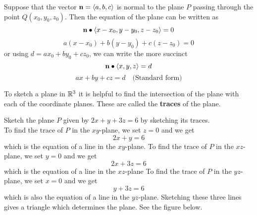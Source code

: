 \documentclass[handout]{ximera}
\begin{document}
\begin{proposition}
Suppose that the vector $\mathbf{n} = \left\langle a,b,c\right\rangle$ is normal to the plane $P$ passing through the point $Q(x_0, y_0, z_0)$.
Then the equation of the plane can be written as
\[
\vec{n} \dotp \vector{x-x_0, y-y_0, z-z_0} = 0 %
\]
\[
a(x-x_0) + b(y-y_0) + c(z-z_0) = 0 %
\]
or using $d = ax_0 + by_0 + cz_0$,  we can write the more succinct
\[
\vec{n} \dotp \vector{x, y, z} = d %
\]
\[
ax+by+cz = d \quad \text{(Standard form)}
\]
\end{proposition}

To sketch a plane in $\mathbb R^3$ it is helpful to find the intersection of the plane with each of the coordinate planes.  
These are called the {\bf traces} of the plane.

\begin{example}
Sketch the plane $P$ given by $2x + y + 3z = 6$ by sketching its traces.\\
To find the trace of $P$ in the $xy$-plane, we set $z = 0$ and we get
\[
2x +y = 6
\]
which is the equation of a line in the $xy$-plane.
To find the trace of $P$ in the $xz$-plane, we set $y = 0$ and we get
\[
2x +3z = 6
\]
which is the equation of a line in the $xz$-plane
To find the trace of $P$ in the $yz$-plane, we set $x = 0$ and we get
\[
 y + 3z = 6
\]
which is also the equation of a line in the $yz$-plane.
Sketching these three lines gives a triangle which determines the plane.
See the figure below.

\begin{image}
\end{image}

\end{example}
\end{document}
